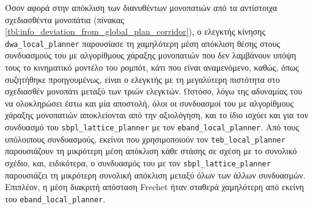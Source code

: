 Όσον αφορά στην απόκλιση των διανυθέντων μονοπατιών από τα αντίστοιχα
σχεδιασθέντα μονοπάτια (πίνακας
\ref{tbl:info_deviation_from_global_plan_corridor}), ο ελεγκτής κίνησης
\texttt{dwa\_local\_planner} παρουσίασε τη χαμηλότερη μέση απόκλιση θέσης στους
συνδυασμούς του με αλγορίθμους χάραξης μονοπατιών που δεν λαμβάνουν υπόψη τους
το κινηματικό μοντέλο του ρομπότ, κάτι που είναι αναμενόμενο, καθώς, όπως
συζητήθηκε προηγουμένως, είναι ο ελεγκτής με τη μεγαλύτερη πιστότητα στο
σχεδιασθέν μονοπάτι μεταξύ των τριών ελεγκτών. Ωστόσο, λόγω της αδυναμίας του
να ολοκληρώσει έστω και μία αποστολή, όλοι οι συνδυασμοί του με αλγορίθμους
χάραξης μονοπατιών αποκλείονται από την αξιολόγηση, και το ίδιο ισχύει και για
τον συνδυασμό του \texttt{sbpl\_lattice\_planner} με τον
\texttt{eband\_local\_planner}. Από τους υπόλοιπους συνδυασμούς, εκείνοι που
χρησιμοποιούν τον \texttt{teb\_local\_planner} παρουσιάζουν τη μικρότερη μέση
απόκλιση κάθε στάσης σε σχέση με το συνολικό σχέδιο, και, ειδικότερα, ο
συνδυασμός του με τον \texttt{sbpl\_lattice\_planner} παρουσιάζει τη μικρότερη
συνολική απόκλιση μεταξύ όλων των άλλων συνδυασμών. Επιπλέον, η μέση διακριτή
απόσταση Frechet ήταν σταθερά χαμηλότερη από εκείνη του
\texttt{eband\_local\_planner}.

